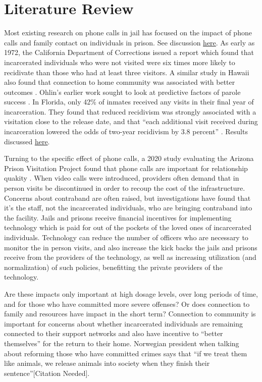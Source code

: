 \documentclass[12pt, a4paper]{article}
\begin{document}
\section{Literature Review}

Most existing research on phone calls in jail has focused on the impact of phone calls and family contact on individuals in prison. See discussion \href{https://www.prisonpolicy.org/blog/2021/12/21/family_contact/}{here}. As early as 1972, the California Department of Corrections issued a report \citep{HoltMiller1972} which found that incarcerated individuals who were not visited were six times more likely to recidivate than those who had at least three visitors. A similar study in Hawaii also found that connection to home community was associated with better outcomes \citep{AdamsFischer1976}. Ohlin's earlier work sought to look at predictive factors of parole success \citep{ohlin_selection_1951}. In Florida, only 42\% of inmates received any visits in their final year of incarceration. They found that reduced recidivism was strongly associated with a visitation close to the release date, and that ``each additional visit received during incarceration lowered the odds of two-year recidivism by 3.8 percent'' \citep{BalesMears2008}. Results discussed \href{https://www.prisonpolicy.org/blog/2018/01/30/knox_report/}{here}.

Turning to the specific effect of phone calls, a 2020 study evaluating the Arizona Prison Visitation Project found that phone calls are important for relationship quakity \citep{haverkate_differential_2020}. When video calls were introduced, providers often demand that in person visits be discontinued in order to recoup the cost of the infrastructure. Concerns about contraband are often raised, but investigations have found that it's the staff, not the incarcerated individuals, who are bringing contraband into the facility. Jails and prisons receive financial incentives for implementing technology which is paid for out of the pockets of the loved ones of incarcerated individuals. Technology can reduce the number of officers who are necessary to monitor the in person visits, and also increase the kick backs the jails and prisons receive from the providers of the technology, as well as increasing utilization (and normalization) of such policies, benefitting the private providers of the technology.

Are these impacts only important at high dosage levels, over long periods of time, and for those who have committed more severe offenses? Or does connection to family and resources have impact in the short term? Connection to community is important for concerns about whether incarcerated individuals are remaining connected to their support networks and also have incentive to ``better themselves'' for the return to their home. Norwegian president when talking about reforming those who have committed crimes says that ``if we treat them like animals, we release animals into society when they finish their sentence''[Citation Needed]. 
\end{document}
